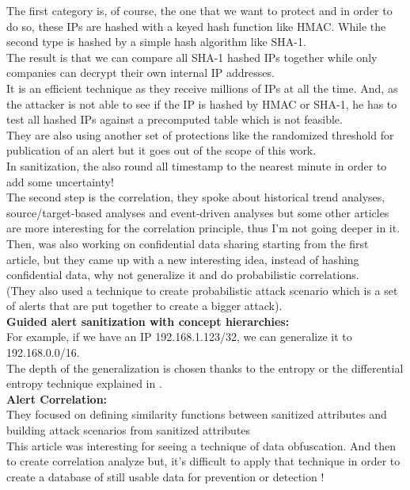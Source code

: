 \documentclass{eplmastersthesis}
\begin{document}
The first category is, of course, the one that we want to protect and in order to do so, these IPs are hashed with a keyed hash function like HMAC. While the second type is hashed by a simple hash algorithm like SHA-1.\\
The result is that we can compare all SHA-1 hashed IPs together while only companies can decrypt their own internal IP addresses.\\
It is an efficient technique as they receive millions of IPs at all the time. And, as the attacker is not able to see if the IP is hashed by HMAC or SHA-1, he has to test all hashed IPs against a precomputed table which is not feasible.\\
They are also using another set of protections like the randomized threshold for publication of an alert but it goes out of the scope of this work.\\
In sanitization, the also round all timestamp to the nearest minute in order to add some uncertainty!\\
The second step is the correlation, they spoke about historical trend analyses, source/target-based analyses and event-driven analyses but some other articles are more interesting for the correlation principle, thus I'm not going deeper in it.\\

Then, \cite{xu2005privacy} was also working on confidential data sharing starting from the first article, but they came up with a new interesting idea, instead of hashing confidential data, why not generalize it and do probabilistic correlations.\\
(They also used a technique to create probabilistic attack scenario which is a set of alerts that are put together to create a bigger attack).\\
\textbf{Guided alert sanitization with concept hierarchies:}\\
For example, if we have an IP 192.168.1.123/32, we can generalize it to 192.168.0.0/16.\\
The depth of the generalization is chosen thanks to the entropy or the differential entropy technique explained in \cite{cover1991elements}.
\\
\textbf{Alert Correlation:}\\
They focused on defining similarity functions between sanitized attributes and building attack scenarios from sanitized attributes
\\

This article was interesting for seeing a technique of data obfuscation. And then to create correlation analyze but, it's difficult to apply that technique in order to create a database of still usable data for prevention or detection !
\\
\end{document}

